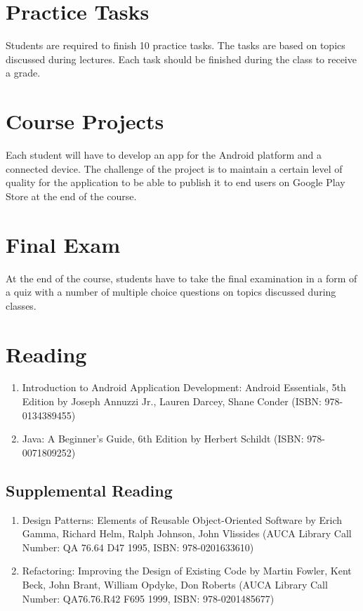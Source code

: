 \documentclass[12pt,a4paper,oneside]{article}
\begin{document}
    \section{Practice Tasks}

        Students are required to finish 10 practice tasks. The tasks are based
        on topics discussed during lectures. Each task should be finished during
        the class to receive a grade.

    \section{Course Projects}

        Each student will have to develop an app for the Android platform and a connected device. The
        challenge of the project is to maintain a certain level of quality for
        the application to be able to publish it to end users on Google Play
        Store at the end of the course.

    \section{Final Exam}

        At the end of the course, students have to take the final examination in
        a form of a quiz with a number of multiple choice questions on topics
        discussed during classes.

    \section{Reading}

        \begin{enumerate}
            \item Introduction to Android Application Development: Android
            Essentials, 5th Edition by Joseph Annuzzi Jr., Lauren Darcey, Shane
            Conder (ISBN: 978-0134389455)
            \item Java: A Beginner's Guide, 6th Edition by Herbert Schildt
            (ISBN: 978-0071809252)
        \end{enumerate}

        \subsection{Supplemental Reading}

            \begin{enumerate}
                \item Design Patterns: Elements of Reusable Object-Oriented
                Software by Erich Gamma, Richard Helm, Ralph Johnson, John
                Vlissides (AUCA Library Call Number: QA 76.64 D47 1995, ISBN:
                978-0201633610)
                \item Refactoring: Improving the Design of Existing Code by
                Martin Fowler, Kent Beck, John Brant, William Opdyke, Don
                Roberts (AUCA Library Call Number: QA76.76.R42 F695 1999, ISBN:
                978-0201485677)
            \end{enumerate}
\end{document}
